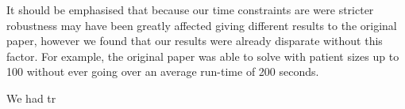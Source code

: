 It should be emphasised that because our time constraints are were stricter robustness may have been greatly affected giving different results to the original paper, however we found that our results were already disparate without this factor. For example, the original paper was able to solve with patient sizes up to 100 without ever going over an average run-time of 200 seconds.

We had tr


